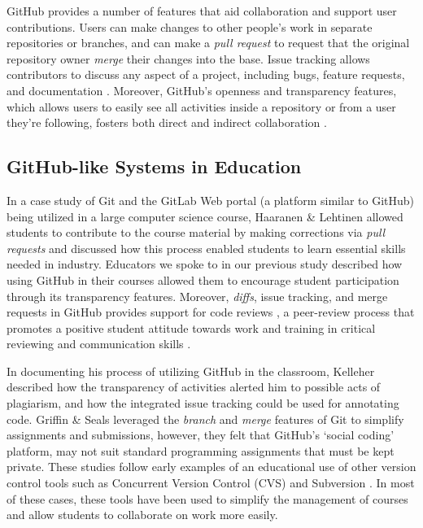 GitHub provides a number of features that aid collaboration and support user contributions. Users can make changes to other people's work in separate repositories or branches, and can make a \emph{pull request} to request that the original repository owner \emph{merge} their changes into the base. Issue tracking allows contributors to discuss any aspect of a project, including bugs, feature requests, and documentation \cite{bissyande2013got}. Moreover, GitHub's openness and transparency features, which allows users to easily see all activities inside a repository or from a user they're following, fosters both direct and indirect collaboration \cite{dabbish2012social}.

\subsection{GitHub-like Systems in Education}
In a case study of Git and the GitLab Web portal (a platform similar to GitHub) being utilized in a large computer science course, Haaranen \& Lehtinen \cite{haaranen2015teaching} allowed students to contribute to the course material by making corrections via \emph{pull requests} and discussed how this process enabled students to learn essential skills needed in industry. Educators we spoke to in our previous study \cite{zagalsky2015emergence} described how using GitHub in their courses allowed them to encourage student participation through its transparency features. Moreover, \emph{diffs}, issue tracking, and merge requests in GitHub provides support for code reviews \cite{kalliamvakou2014promises}, a peer-review process that promotes a positive student attitude towards work and training in critical reviewing and communication skills \cite{hundhausen2013talking}.

In documenting his process of utilizing GitHub in the classroom, Kelleher \cite{kelleher2014employing} described how the transparency of activities alerted him to possible acts of plagiarism, and how the integrated issue tracking could be used for annotating code. Griffin \& Seals \cite{griffin2013github} leveraged the \emph{branch} and \emph{merge} features of Git to simplify assignments and submissions, however, they felt that GitHub's `social coding' platform, may not suit standard programming assignments that must be kept private. These studies follow early examples of an educational use of other version control tools such as Concurrent Version Control (CVS) \cite{reid2005learning} and Subversion \cite{clifton2007subverting}. In most of these cases, these tools have been used to simplify the management of courses and allow students to collaborate on work more easily. %

